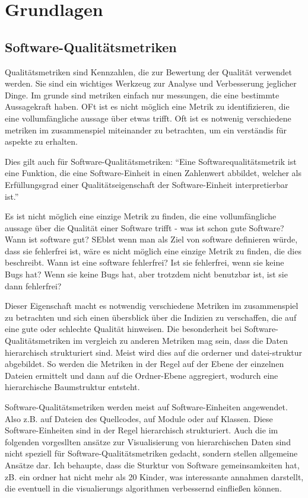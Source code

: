 \section{Grundlagen} \label{sec:Grundlagen}

\subsection{Software-Qualitätsmetriken} \label{sec:SoftwareQualitaetsmetriken}
Qualitätsmetriken sind Kennzahlen, die zur Bewertung der Qualität verwendet werden. Sie sind ein wichtiges Werkzeug zur Analyse und Verbesserung jeglicher Dinge. Im grunde sind metriken einfach nur messungen, die eine bestimmte Aussagekraft haben. OFt ist es nicht möglich eine Metrik zu identifizieren, die eine vollumfängliche aussage über etwas trifft. Oft ist es notwenig verschiedene metriken im zusammenspiel miteinander zu betrachten, um ein verständis für aspekte zu erhalten. 

Dies gilt auch für Software-Qualitätsmetriken: \enquote{Eine Softwarequalitätsmetrik ist eine Funktion, die eine Software-Einheit in einen Zahlenwert abbildet, welcher als Erfüllungsgrad einer Qualitätseigenschaft der Software-Einheit interpretierbar ist.}\cite{def_qual_metric}

Es ist nicht möglich eine einzige Metrik zu finden, die eine vollumfängliche aussage über die Qualität einer Software trifft - was ist schon gute Software? Wann ist software gut? SEblst wenn man als Ziel von software definieren würde, dass sie fehlerfrei ist, wäre es nicht möglich eine einzige Metrik zu finden, die dies beschreibt. Wann ist eine software fehlerfrei? Ist sie fehlerfrei, wenn sie keine Bugs hat? Wenn sie keine Bugs hat, aber trotzdem nicht benutzbar ist, ist sie dann fehlerfrei?

Dieser Eigenschaft macht es notwendig verschiedene Metriken im zusammenspiel zu betrachten und sich einen übersblick über die Indizien zu verschaffen, die auf eine gute oder schlechte Qualität hinweisen.
Die besonderheit bei Software-Qualitätsmetriken im vergleich zu anderen Metriken mag sein, dass die Daten hierarchisch strukturiert sind. Meist wird dies auf die orderner und datei-struktur abgebildet. So werden die Metriken in der Regel auf der Ebene der einzelnen Dateien ermittelt und dann auf die Ordner-Ebene aggregiert, wodurch eine hierarchische Baumstruktur entsteht. 

Software-Qualitätsmetriken werden meist auf Software-Einheiten angewendet. Also z.B. auf Dateien des Quellcodes, auf Module oder auf Klassen. Diese Software-Einheiten sind in der Regel hierarchisch strukturiert. Auch die im folgenden vorgesllten ansätze zur Visualisierung von hierarchischen Daten sind nicht speziell für Software-Qualitätsmetriken gedacht, sondern stellen allgemeine Ansätze dar. Ich behaupte, dass die Sturktur von Software gemeinsamkeiten hat, zB. ein ordner hat nicht mehr als 20 Kinder, was interessante annahmen darstellt, die eventuell in die visualierungs algorithmen verbessernd einfließen können.  

